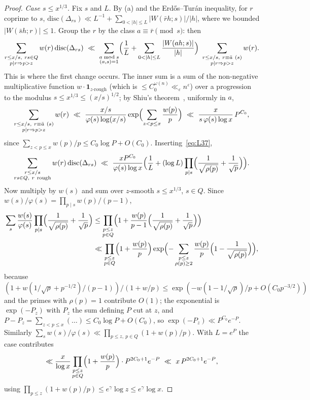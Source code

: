 \documentclass[11pt,a4paper]{article}
\theoremstyle{remark}\newtheorem{remark}[theorem]{Remark}
\begin{document}
\begin{proof}
\emph{Case $s\le x^{1/3}$.} Fix $s$ and $L$. By (a) and the Erd\H os--Tur\'an inequality, for $r$ coprime to $s$,
$\mathrm{disc}(\Delta_{rs})\ll L^{-1}+\sum_{0<|h|\le L}|W(\bar rh;s)|/|h|$, where we bounded $|W(\bar sh;r)|\le1$. Group the $r$
by the class $a\equiv\bar r\pmod s$: then
\[
\sum_{\substack{r\le x/s,\ rs\in Q\\ p\mid r\Rightarrow p>z}}w(r)\,\mathrm{disc}(\Delta_{rs})\ \ll\ \sum_{\substack{a\bmod s\\ (a,s)=1}}\Bigl(\frac1L+\sum_{0<|h|\le L}\frac{|W(ah;s)|}{|h|}\Bigr)\ \sum_{\substack{r\le x/s,\ r\equiv\bar a\ (s)\\ p\mid r\Rightarrow p>z}}w(r).
\]
This is where the first change occurs. The inner sum is a sum of the non-negative multiplicative function
$w\cdot\mathbf 1_{\text{$z$-rough}}$ (which is $\le C_0^{\omega(n)}\ll_\varepsilon n^\varepsilon$) over a progression to the modulus
$s\le x^{1/3}\le(x/s)^{1/2}$; by Shiu's theorem~\cite{Shiu1980}, uniformly in $a$,
\[
\sum_{\substack{r\le x/s,\ r\equiv\bar a\ (s)\\ p\mid r\Rightarrow p>z}}w(r)\ \ll\ \frac{x/s}{\varphi(s)\log(x/s)}\exp\Bigl(\sum_{z<p\le x}\frac{w(p)}p\Bigr)\ \ll\ \frac{x}{s\,\varphi(s)\log x}\,P^{C_0},
\]
since $\sum_{z<p\le x}w(p)/p\le C_0\log P+O(C_0)$. Inserting~\eqref{eq:L37},
\[
\sum_{\substack{r\le x/s\\ rs\in Q,\ r\ \mathrm{rough}}}w(r)\,\mathrm{disc}(\Delta_{rs})\ \ll\ \frac{xP^{C_0}}{\varphi(s)\log x}\Bigl(\frac1L+(\log L)\prod_{p\mid s}\Bigl(\frac1{\sqrt{\rho(p)}}+\frac1{\sqrt p}\Bigr)\Bigr).
\]
Now multiply by $w(s)$ and sum over $z$-smooth $s\le x^{1/3}$, $s\in Q$. Since $w(s)/\varphi(s)=\prod_{p\mid s}w(p)/(p-1)$,
\[
\begin{aligned}
\sum_{s}\frac{w(s)}{\varphi(s)}\prod_{p\mid s}\Bigl(\frac1{\sqrt{\rho(p)}}+\frac1{\sqrt p}\Bigr)&\le\prod_{\substack{p\le z\\ p\in Q}}\Bigl(1+\frac{w(p)}{p-1}\Bigl(\frac1{\sqrt{\rho(p)}}+\frac1{\sqrt p}\Bigr)\Bigr)\\
&\ll\prod_{\substack{p\le z\\ p\in Q}}\Bigl(1+\frac{w(p)}{p}\Bigr)\exp\Bigl(-\sum_{\substack{p\le z\\ \rho(p)\ge2}}\frac{w(p)}p\Bigl(1-\frac1{\sqrt{\rho(p)}}\Bigr)\Bigr),
\end{aligned}
\]
because $(1+w(1/\sqrt\rho+p^{-1/2})/(p-1))/(1+w/p)\le\exp(-w(1-1/\sqrt\rho)/p+O(C_0p^{-3/2}))$ and the primes with
$\rho(p)=1$ contribute $O(1)$; the exponential is $\exp(-P_z)$ with $P_z$ the sum defining $P$ cut at $z$, and
$P-P_z=\sum_{z<p\le x}(\dots)\le C_0\log P+O(C_0)$, so $\exp(-P_z)\ll P^{C_0}e^{-P}$. Similarly
$\sum_s w(s)/\varphi(s)\ll\prod_{p\le z,\ p\in Q}(1+w(p)/p)$. With $L=e^{P}$ the case contributes
\[
\ll\frac{x}{\log x}\prod_{\substack{p\le z\\ p\in Q}}\Bigl(1+\frac{w(p)}p\Bigr)\cdot P^{2C_0+1}e^{-P}\ \ll\ x\,P^{2C_0+1}e^{-P},
\]
using $\prod_{p\le z}(1+w(p)/p)\le e^\gamma\log z\le e^\gamma\log x$.


\end{proof}
\end{document}
